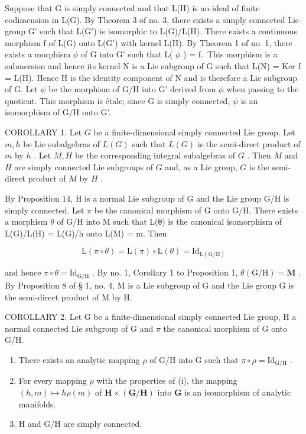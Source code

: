Suppose that G is simply connected and that L(H) is an ideal of finite codimension in L(G). By Theorem 3 of no. 3, there exists a simply connected Lie group G' such that L(G') is isomorphic to L(G)/L(H). There exists a continuous morphism f of L(G) onto L(G') with kernel L(H). By Theorem 1 of no. 1, there exists a morphism \(\phi\) of G into G' such that L( \(\phi\) ) = f.~This morphism is a submersion and hence its kernel N is a Lie subgroup of G such that L(N) = Ker f = L(H). Hence H is the identity component of N and is therefore a Lie subgroup of G. Let \(\psi\) be the morphism of G/H into G' derived from \(\phi\) when passing to the quotient. This morphism is étale; since G is simply connected, \(\psi\) is an isomorphism of G/H onto G'.

COROLLARY 1. Let \(G\) be a finite-dimensional simply connected Lie group. Let \(m, h\) be Lie subalgebras of \(L(G)\) such that \(L(G)\) is the semi-direct product of \(m\) by \(h\) . Let \(M, H\) be the corresponding integral subalgebras of \(G\) . Then \(M\) and \(H\) are simply connected Lie subgroups of \(G\) and, as a Lie group, \(G\) is the semi-direct product of \(M\) by \(H\) .

By Proposition 14, H is a normal Lie subgroup of G and the Lie group G/H is simply connected. Let \(\pi\) be the canonical morphism of G onto G/H. There exists a morphism \(\theta\) of G/H into M such that L(θ) is the canonical isomorphism of L(G)/L(H) = L(G)/h onto L(M) = m. Then

\[
\mathrm{L} (\pi \circ \theta) = \mathrm{L} (\pi) \circ \mathrm{L} (\theta) = \mathrm{Id} _ {\mathrm{L} (\mathrm{G} / \mathrm{H})}
\]

and hence \(\pi \circ \theta = \mathrm{Id}_{\mathrm{G}/\mathrm{H}}\) . By no. 1, Corollary 1 to Proposition 1, \(\theta (\mathrm{G / H}) = \mathbf{M}\) . By Proposition 8 of § 1, no. 4, M is a Lie subgroup of G and the Lie group G is the semi-direct product of M by H.

COROLLARY 2. Let G be a finite-dimensional simply connected Lie group, H a normal connected Lie subgroup of G and \(\pi\) the canonical morphism of G onto G/H.

\begin{enumerate}
\def\labelenumi{(\roman{enumi})}
\item
  There exists an analytic mapping \(\rho\) of G/H into G such that \(\pi \circ \rho = \mathrm{Id}_{\mathrm{G / H}}\) .
\item
  For every mapping \(\rho\) with the properties of (i), the mapping \((h, m) \mapsto h\rho(m)\) of \(\mathbf{H} \times (\mathbf{G}/\mathbf{H})\) into \(\mathbf{G}\) is an isomorphism of analytic manifolds.
\item
  H and G/H are simply connected.
\end{enumerate}


